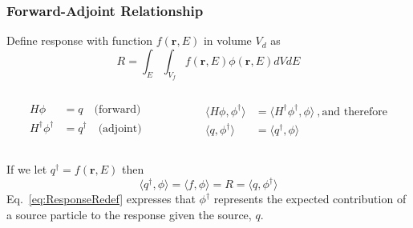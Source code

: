 \documentclass[xcolor=x11names,compress]{beamer}
\renewcommand{\(}{\begin{columns}}
\renewcommand{\)}{\end{columns}}
\newcommand{\<}[1]{\begin{column}{#1}}
\renewcommand{\>}{\end{column}}
\newcommand{\ve}[1]{\ensuremath{\mathbf{#1}}}
\begin{document}
\begin{frame}[fragile]
  \frametitle{Forward-Adjoint Relationship}
Define response with function $f(\ve{r}, E)$ in volume $V_d$ as
%
\begin{equation}
 R = \int_E \int_{V_f} f(\ve{r}, E) \phi(\ve{r}, E) dV dE 
 \label{eq:Response}
\end{equation}
%
\begin{columns}
  \begin{column}{0.5\textwidth}
	\begin{align}
  	H\phi &= q \quad \text{(forward)}\nonumber \\
  	H^{\dagger} \phi^{\dagger} &= q^{\dagger} \quad 
  	\text{(adjoint)}\nonumber
  	\end{align}
  \end{column}
  \begin{column}{0.5\textwidth}
  	\begin{align}
  	\langle H\phi, \phi^{\dagger} \rangle &= \langle H^{\dagger} \phi^{\dagger}, \phi \rangle \:, \text{and therefore} \nonumber \\
  	\langle q, \phi^{\dagger} \rangle &= \langle q^{\dagger}, \phi \rangle \nonumber
  	\end{align}
  \end{column}
\end{columns}
\vspace*{1 em}
If we let $q^{\dagger} = f(\ve{r}, E)$ then
%
\begin{equation}
 \langle q^{\dagger}, \phi \rangle = \langle f, \phi \rangle = R = \langle q, \phi^{\dagger} \rangle
 \label{eq:ResponseRedef}
\end{equation}
%
Eq.\ \eqref{eq:ResponseRedef} expresses that $\phi^{\dagger}$ represents the expected contribution of a source particle to the response given the source, $q$.

\end{frame}
\end{document}
